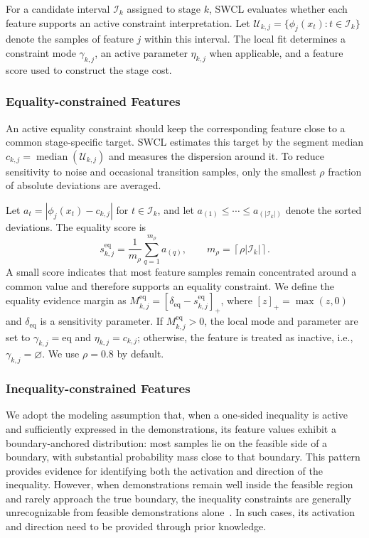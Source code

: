 \documentclass[lettersize,journal]{IEEEtran}
\begin{document}
For a candidate interval $\mathcal{I}_k$ assigned to stage $k$, SWCL evaluates whether each feature supports an active constraint interpretation. Let $\mathcal{U}_{k,j}=\{\phi_j(x_t):t\in\mathcal{I}_k\}$ denote the samples of feature $j$ within this interval. The local fit determines a constraint mode $\gamma_{k,j}$, an active parameter $\eta_{k,j}$ when applicable, and a feature score used to construct the stage cost. 

\subsubsection{Equality-constrained Features}
An active equality constraint should keep the corresponding feature close to a common stage-specific target. SWCL estimates this target by the segment median $c_{k,j}=\operatorname{median}(\mathcal{U}_{k,j})$ and measures the dispersion around it. To reduce sensitivity to noise and occasional transition samples, only the smallest $\rho$ fraction of absolute deviations are averaged.

Let $a_t=|\phi_j(x_t)-c_{k,j}|$ for $t\in\mathcal{I}_k$, and let $a_{(1)}\leq\cdots\leq a_{(|\mathcal{I}_k|)}$ denote the sorted deviations. The equality score is
\begin{equation}
s_{k,j}^{\mathrm{eq}}
=
\frac{1}{m_\rho}
\sum_{q=1}^{m_\rho} a_{(q)},
\qquad
m_\rho
=
\left\lceil
\rho |\mathcal{I}_k|
\right\rceil .
\label{eq:eq_dispersion_score}
\end{equation}
A small score indicates that most feature samples remain concentrated around a common value and therefore supports an equality constraint. We define the equality evidence margin as $M_{k,j}^{\mathrm{eq}}=[\delta_{\mathrm{eq}}-s_{k,j}^{\mathrm{eq}}]_+$, where $[z]_+=\max(z,0)$ and $\delta_{\mathrm{eq}}$ is a sensitivity parameter. If $M_{k,j}^{\mathrm{eq}}>0$, the local mode and parameter are set to $\gamma_{k,j}=\mathrm{eq}$ and $\eta_{k,j}=c_{k,j}$; otherwise, the feature is treated as inactive, i.e., $\gamma_{k,j}=\varnothing$. We use $\rho=0.8$ by default. 

\subsubsection{Inequality-constrained Features}
We adopt the modeling assumption that, when a one-sided inequality is active and sufficiently expressed in the demonstrations, its feature values exhibit a boundary-anchored distribution: most samples lie on the feasible side of a boundary, with substantial probability mass close to that boundary. This pattern provides evidence for identifying both the activation and direction of the inequality. However, when demonstrations remain well inside the feasible region and rarely approach the true boundary,  the inequality constraints are generally unrecognizable from feasible demonstrations alone~\cite{chou2020local}. In such cases, its activation and direction need to be provided through prior knowledge.
\end{document}
